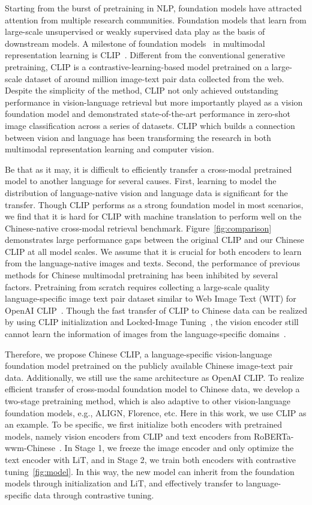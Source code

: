 \documentclass[11pt]{article}
\begin{document}
Starting from the burst of pretraining in NLP, foundation models have attracted attention from multiple research communities. 
Foundation models that learn from large-scale unsupervised or weakly supervised data play as the basis of downstream models. 
A milestone of foundation models~\citep{foundation_model} in multimodal representation learning is CLIP~\cite{clip}. 
Different from the conventional generative pretraining, CLIP is a contrastive-learning-based model pretrained on a large-scale dataset of around  million image-text pair data collected from the web. 
Despite the simplicity of the method, CLIP not only achieved outstanding performance in vision-language retrieval but more importantly played as a vision foundation model and demonstrated state-of-the-art performance in zero-shot image classification across a series of datasets. 
CLIP which builds a connection between vision and language has been transforming the research in both multimodal representation learning and computer vision. 

Be that as it may, it is difficult to efficiently transfer a cross-modal pretrained model to another language for several causes. 
First, learning to model the distribution of language-native vision and language data is significant for the transfer. 
Though CLIP performs as a strong foundation model in most scenarios, we find that it is hard for CLIP with machine translation to perform well on the Chinese-native cross-modal retrieval benchmark.
Figure~\ref{fig:comparison} demonstrates large performance gaps between the original CLIP and our Chinese CLIP at all model scales. 
We assume that it is crucial for both encoders to learn from the language-native images and texts. 
Second, the performance of previous methods for Chinese multimodal pretraining has been inhibited by several factors. Pretraining from scratch requires collecting a large-scale quality language-specific image text pair dataset similar to Web Image Text (WIT) for OpenAI CLIP~\citep{wenlan, r2d2}. Though the fast transfer of CLIP to Chinese data can be realized by using CLIP initialization and Locked-Image Tuning~\citep{lit}, the vision encoder still cannot learn the information of images from the language-specific domains~\citep{wukong}. 




Therefore, we propose Chinese CLIP, a language-specific vision-language foundation model pretrained on the publicly available Chinese image-text pair data.  
Additionally, we still use the same architecture as OpenAI CLIP.  
To realize efficient transfer of cross-modal foundation model to Chinese data, we develop a two-stage pretraining method, which is also adaptive to other vision-language foundation models, e.g., ALIGN, Florence, etc. 
Here in this work, we use CLIP as an example. 
To be specific, we first initialize both encoders with pretrained models, namely vision encoders from CLIP and text encoders from RoBERTa-wwm-Chinese~\citep{wwm}. In Stage 1, we freeze the image encoder and only optimize the text encoder with LiT, and in Stage 2, we train both encoders with contrastive tuning~\ref{fig:model}. 
In this way, the new model can inherit from the foundation models through initialization and LiT, and effectively transfer to language-specific data through contrastive tuning. 
\end{document}
